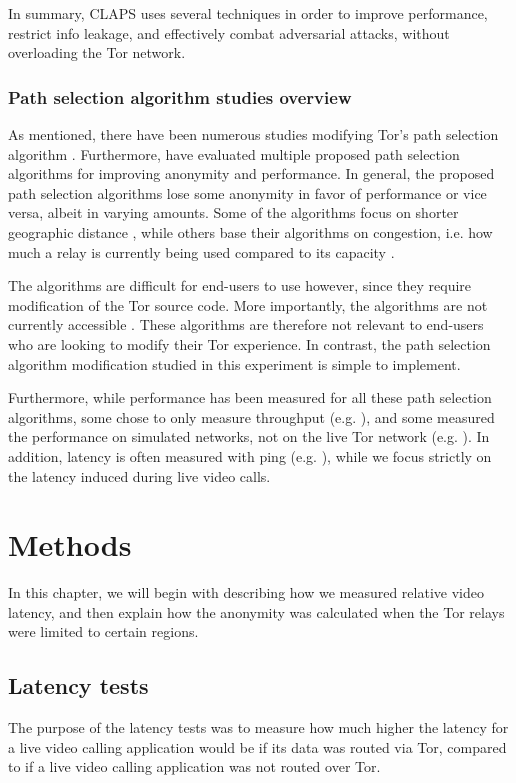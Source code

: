 \documentclass{kththesis}
\begin{document}
In summary, CLAPS uses several techniques in order to improve performance, restrict info leakage, and effectively combat adversarial attacks, without overloading the Tor network.

\subsection{Path selection algorithm studies overview}
As mentioned, there have been numerous studies modifying Tor's path selection algorithm \parencite{CLAPS}\parencite{LASTor}\parencite{5684020}\parencite{1866345}\parencite{wang2012congestion}. Furthermore, \textcite{wacek2013empirical} have evaluated multiple proposed path selection algorithms for improving anonymity and performance. In general, the proposed path selection algorithms lose some anonymity in favor of performance or vice versa, albeit in varying amounts. Some of the algorithms focus on shorter geographic distance \parencite{LASTor}, while others base their algorithms on congestion, i.e. how much a relay is currently being used compared to its capacity \parencite{wang2012congestion}.

The algorithms are difficult for end-users to use however, since they require modification of the Tor source code. More importantly, the algorithms are not currently accessible \parencite{CLAPSgithub}. These algorithms are therefore not relevant to end-users who are looking to modify their Tor experience. In contrast, the path selection algorithm modification studied in this experiment is simple to implement.

Furthermore, while performance has been measured for all these path selection algorithms, some chose to only measure throughput (e.g. \textcite{5684020}), and some measured the performance on simulated networks, not on the live Tor network (e.g. \textcite{CLAPS}). In addition, latency is often measured with ping (e.g. \textcite{wacek2013empirical}), while we focus strictly on the latency induced during live video calls.

\chapter{Methods}
In this chapter, we will begin with describing how we measured relative video latency, and then explain how the anonymity was calculated when the Tor relays were limited to certain regions.

\section{Latency tests}
The purpose of the latency tests was to measure how much higher the latency for a live video calling application would be if its data was routed via Tor, compared to if a live video calling application was not routed over Tor.
\end{document}
